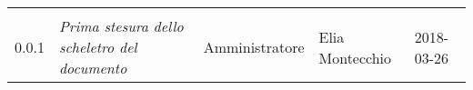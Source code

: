 \newpage 
\section*{}
\begin{table}[H]
	\centering
	\begin{tabular}{C{2cm}|C{4cm}|C{3cm}|C{3cm}|R{2cm}}
		
		 & & & & \\
		
		
		
		0.0.1 & \emph{Prima stesura dello scheletro del documento} & Amministratore & Elia Montecchio &  2018-03-26 \\
		
	\end{tabular}
	
\end{table}


\clearpage